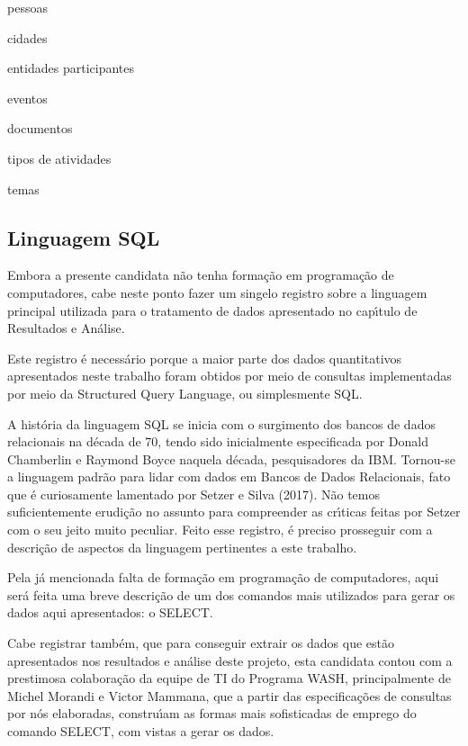\documentclass[
12pt,		%
openright,	%
twoside,  %
a4paper,			%
chapter=TITLE,		%
english,			%
french,				%
spanish,			%
brazil				%
]{USPSC-classe/USPSC}
\begin{document}
\begin{alineas}
\item pessoas
\item cidades
\item entidades participantes
\item eventos
\item documentos
\item tipos de atividades
\item temas
\end{alineas}

\subsection[Linguagem SQL]{Linguagem SQL}\label{Linguagem SQL}
Embora a presente candidata n\~ao tenha forma\c{c}\~ao em programa\c{c}\~ao de computadores, cabe neste ponto fazer um singelo registro sobre a linguagem principal utilizada para o tratamento de dados apresentado no cap\'{\i}tulo de \textquotedbl Resultados e An\'alise\textquotedbl .




Este registro \'e necess\'ario porque a maior parte dos dados quantitativos apresentados neste trabalho foram obtidos por meio de consultas implementadas por meio da Structured Query Language, ou simplesmente SQL.




A hist\'oria da linguagem SQL se inicia com o surgimento dos bancos de dados relacionais na d\'ecada de 70, tendo sido inicialmente especificada por Donald Chamberlin e Raymond Boyce naquela d\'ecada, pesquisadores da IBM. Tornou-se a linguagem padr\~ao para lidar com dados em Bancos de Dados Relacionais, fato que \'e curiosamente lamentado por  Setzer e Silva (2017). N\~ao temos suficientemente erudi\c{c}\~ao no assunto para compreender as cr\'{\i}ticas feitas por Setzer com o seu jeito muito peculiar. Feito esse registro, \'e preciso prosseguir com a descri\c{c}\~ao de aspectos da linguagem pertinentes a este trabalho.




Pela j\'a mencionada falta de forma\c{c}\~ao em programa\c{c}\~ao de computadores, aqui ser\'a feita uma breve descri\c{c}\~ao de um dos comandos mais utilizados para gerar os dados aqui apresentados: o SELECT.




Cabe registrar tamb\'em, que para conseguir extrair os dados que est\~ao apresentados nos resultados e an\'alise deste projeto, esta candidata contou com a prestimosa colabora\c{c}\~ao da equipe de TI do Programa WASH, principalmente de Michel Morandi e Victor Mammana, que a partir das especifica\c{c}\~oes de consultas por n\'os elaboradas, constru\'{\i}am as formas mais sofisticadas de emprego do comando SELECT, com vistas a gerar os dados.
\end{document}
